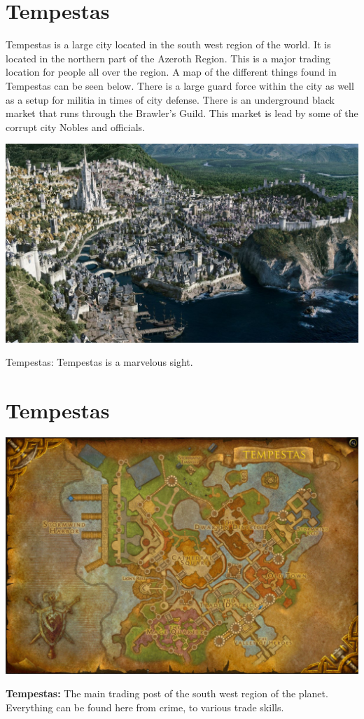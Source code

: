 \section{Tempestas}

Tempestas is a large city located in the south west region of the world. It is located in the northern part of the Azeroth Region. This is a major trading location for people all over the region. A map of the different things found in Tempestas can be seen below. There is a large guard force within the city as well as a setup for militia in times of city defense. There is an underground black market that runs through the Brawler's Guild. This market is lead by some of the corrupt city Nobles and officials.

\begin{center}
	\includegraphics[width=\linewidth]{img/WoW/1200px-StormwindPanorama.jpg}
	
	{Tempestas: Tempestas is a marvelous sight.}
\end{center}

\section{Tempestas}
\begin{center}
	\includegraphics[width=\linewidth]{img/maps/Tempestas.jpg}
	
	{\textbf{Tempestas:} The main trading post of the south west region of the planet. Everything can be found here from crime, to various trade skills.}
\end{center}

